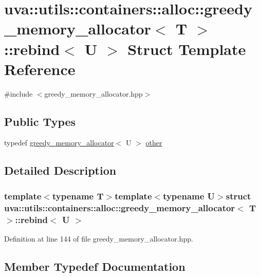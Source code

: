 \hypertarget{structuva_1_1utils_1_1containers_1_1alloc_1_1greedy__memory__allocator_1_1rebind}{}\section{uva\+:\+:utils\+:\+:containers\+:\+:alloc\+:\+:greedy\+\_\+memory\+\_\+allocator$<$ T $>$\+:\+:rebind$<$ U $>$ Struct Template Reference}
\label{structuva_1_1utils_1_1containers_1_1alloc_1_1greedy__memory__allocator_1_1rebind}


{\ttfamily \#include $<$greedy\+\_\+memory\+\_\+allocator.\+hpp$>$}

\subsection*{Public Types}
\begin{DoxyCompactItemize}
\item 
typedef \hyperlink{classuva_1_1utils_1_1containers_1_1alloc_1_1greedy__memory__allocator}{greedy\+\_\+memory\+\_\+allocator}$<$ U $>$ \hyperlink{structuva_1_1utils_1_1containers_1_1alloc_1_1greedy__memory__allocator_1_1rebind_acb518823bdcac17f79ad4ef0273b5186}{other}
\end{DoxyCompactItemize}


\subsection{Detailed Description}
\subsubsection*{template$<$typename T$>$template$<$typename U$>$struct uva\+::utils\+::containers\+::alloc\+::greedy\+\_\+memory\+\_\+allocator$<$ T $>$\+::rebind$<$ U $>$}



Definition at line 144 of file greedy\+\_\+memory\+\_\+allocator.\+hpp.



\subsection{Member Typedef Documentation}
\hypertarget{structuva_1_1utils_1_1containers_1_1alloc_1_1greedy__memory__allocator_1_1rebind_acb518823bdcac17f79ad4ef0273b5186}{}
